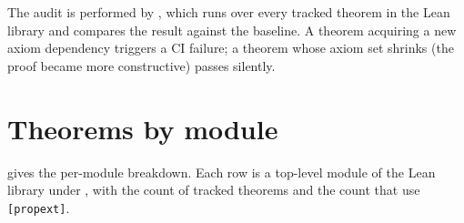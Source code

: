 The audit is performed by ,
which runs  over every tracked theorem
in the Lean library and compares the result against the baseline.
A theorem acquiring a new axiom dependency triggers a CI failure;
a theorem whose axiom set shrinks (the proof became more
constructive) passes silently.

\section{Theorems by module}
\label{sec:audit-by-module}

 gives the per-module breakdown.  Each
row is a top-level module of the Lean library under
, with the count of tracked theorems and the
count that use \texttt{[propext]}.

